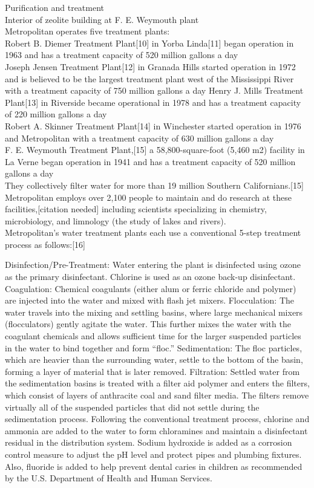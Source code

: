 \documentclass{article}
\begin{document}
Purification and treatment\\

Interior of zeolite building at F. E. Weymouth plant\\
Metropolitan operates five treatment plants:\\

Robert B. Diemer Treatment Plant[10] in Yorba Linda[11] began operation in 1963 and has a treatment capacity of 520 million gallons a day\\
Joseph Jensen Treatment Plant[12] in Granada Hills started operation in 1972 and is believed to be the largest treatment plant west of the Mississippi River with a treatment capacity of 750 million gallons a day
Henry J. Mills Treatment Plant[13] in Riverside became operational in 1978 and has a treatment capacity of 220 million gallons a day\\
Robert A. Skinner Treatment Plant[14] in Winchester started operation in 1976 and Metropolitan with a treatment capacity of 630 million gallons a day\\
F. E. Weymouth Treatment Plant,[15] a 58,800-square-foot (5,460 m2) facility in La Verne began operation in 1941 and has a treatment capacity of 520 million gallons a day\\
They collectively filter water for more than 19 million Southern Californians.[15] Metropolitan employs over 2,100 people to maintain and do research at these facilities,[citation needed] including scientists specializing in chemistry, microbiology, and limnology (the study of lakes and rivers).\\

Metropolitan's water treatment plants each use a conventional 5-step treatment process as follows:[16]

Disinfection/Pre-Treatment: Water entering the plant is disinfected using ozone as the primary disinfectant. Chlorine is used as an ozone back-up disinfectant.
Coagulation: Chemical coagulants (either alum or ferric chloride and polymer) are injected into the water and mixed with flash jet mixers.
Flocculation: The water travels into the mixing and settling basins, where large mechanical mixers (flocculators) gently agitate the water. This further mixes the water with the coagulant chemicals and allows sufficient time for the larger suspended particles in the water to bind together and form “floc.”
Sedimentation: The floc particles, which are heavier than the surrounding water, settle to the bottom of the basin, forming a layer of material that is later removed.
Filtration: Settled water from the sedimentation basins is treated with a filter aid polymer and enters the filters, which consist of layers of anthracite coal and sand filter media. The filters remove virtually all of the suspended particles that did not settle during the sedimentation process.
Following the conventional treatment process, chlorine and ammonia are added to the water to form chloramines and maintain a disinfectant residual in the distribution system. Sodium hydroxide is added as a corrosion control measure to adjust the pH level and protect pipes and plumbing fixtures. Also, fluoride is added to help prevent dental caries in children as recommended by the U.S. Department of Health and Human Services.
\end{document}
